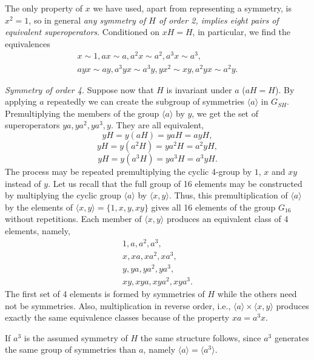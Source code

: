 {The only property  of $x$ we have used, apart from representing a symmetry,
is $x^2=1$, so in general
{\it any symmetry of $H$ of order 2, implies eight pairs of equivalent superoperators}.  Conditioned on
$xH=H$,  in particular, we find the equivalences
%
\begin{eqnarray}
x\sim 1, ax\sim a, a^2x\sim a^2, a^3x\sim a^3,
\nonumber\\
ayx\sim ay, a^3yx\sim a^3y, yx^2\sim xy, a^2yx\sim a^2y.
\end{eqnarray}
%


{\it Symmetry of order 4.} Suppose now that $H$ is invariant under $a$ ($aH=H$). By applying $a$ repeatedly  we can create the subgroup of symmetries $\langle a \rangle$  in $G_{SH}$.
Premultiplying the members of the group $\langle a \rangle$ by  $y$, we get the set of superoperators $ya,ya^{2},ya^{3},y$. They are all equivalent,
%
\begin{equation}
yH=y(aH)=yaH=ayH,
\end{equation}
\begin{equation}
yH=y(a^{2}H)=ya^{2}H=a^{2}yH,
\end{equation}
\begin{equation}
yH=y(a^{3}H)=ya^{3}H=a^{3}yH.
\end{equation}
%
The process may be repeated premultiplying the cyclic 4-group by $1$, $x$ and $xy$ instead of $y$. Let us recall that the full group
 of 16 elements may be constructed by multiplying the cyclic group $\langle a\rangle$ by $\langle x,y\rangle$.
Thus, this  premultiplication of $\langle a \rangle$ by the elements of $\langle x,y\rangle=\{1,x,y,xy\}$ gives
all 16 elements of the group $G_{16}$ without repetitions. Each member of $\langle x,y\rangle$ produces an equivalent class of 4 elements, namely,
%
\begin{eqnarray}
1,a,a^2,a^3,
\\
x,xa,xa^2,xa^3,
\\
y,ya,ya^2,ya^3,
\\
xy,xya,xya^2,xya^3.
\end{eqnarray}
%
The first set of 4 elements is formed by symmetries of $H$ while the others need not be symmetries.
Also, multiplication in reverse order, i.e., $\langle a\rangle \times \langle x,y\rangle$ produces exactly the same equivalence classes because of the property $xa=a^3 x$.



If $a^3$ is the assumed  symmetry of $H$
the same structure follows, since $a^3$ generates the same group of symmetries than $a$,
namely $\langle a\rangle=\langle a^3\rangle$.



}
